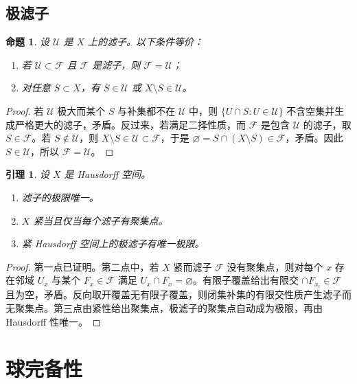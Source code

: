\documentclass[11pt,a4paper,openany]{ctexbook}
\numberwithin{equation}{chapter}
\theoremstyle{plain}
\newtheorem{proposition}[theorem]{命题}
\newtheorem{lemma}[theorem]{引理}
\theoremstyle{definition}
\theoremstyle{remark}
\begin{document}
\subsection{极滤子}

\begin{proposition}
设 $\mathcal U$ 是 $X$ 上的滤子。以下条件等价：
\begin{enumerate}[label=(\arabic*)]
\item 若 $\mathcal U\subset\mathcal F$ 且 $\mathcal F$ 是滤子，则 $\mathcal F=\mathcal U$；
\item 对任意 $S\subset X$，有 $S\in\mathcal U$ 或 $X\setminus S\in\mathcal U$。
\end{enumerate}
\end{proposition}

\begin{proof}
若 $\mathcal U$ 极大而某个 $S$ 与补集都不在 $\mathcal U$ 中，则 $\{U\cap S:U\in\mathcal U\}$ 不含空集并生成严格更大的滤子，矛盾。反过来，若满足二择性质，而 $\mathcal F$ 是包含 $\mathcal U$ 的滤子，取 $S\in\mathcal F$。若 $S\notin\mathcal U$，则 $X\setminus S\in\mathcal U\subset\mathcal F$，于是 $\varnothing=S\cap(X\setminus S)\in\mathcal F$，矛盾。因此 $S\in\mathcal U$，所以 $\mathcal F=\mathcal U$。
\end{proof}

\begin{lemma}
设 $X$ 是 Hausdorff 空间。
\begin{enumerate}[label=(\arabic*)]
\item 滤子的极限唯一。
\item $X$ 紧当且仅当每个滤子有聚集点。
\item 紧 Hausdorff 空间上的极滤子有唯一极限。
\end{enumerate}
\end{lemma}

\begin{proof}
第一点已证明。第二点中，若 $X$ 紧而滤子 $\mathcal F$ 没有聚集点，则对每个 $x$ 存在邻域 $U_x$ 与某个 $F_x\in\mathcal F$ 满足 $U_x\cap F_x=\varnothing$。有限子覆盖给出有限交 $\cap F_{x_i}\in\mathcal F$ 且为空，矛盾。反向取开覆盖无有限子覆盖，则闭集补集的有限交性质产生滤子而无聚集点。第三点由紧性给出聚集点，极滤子的聚集点自动成为极限，再由 Hausdorff 性唯一。
\end{proof}

\section{球完备性}
\end{document}

